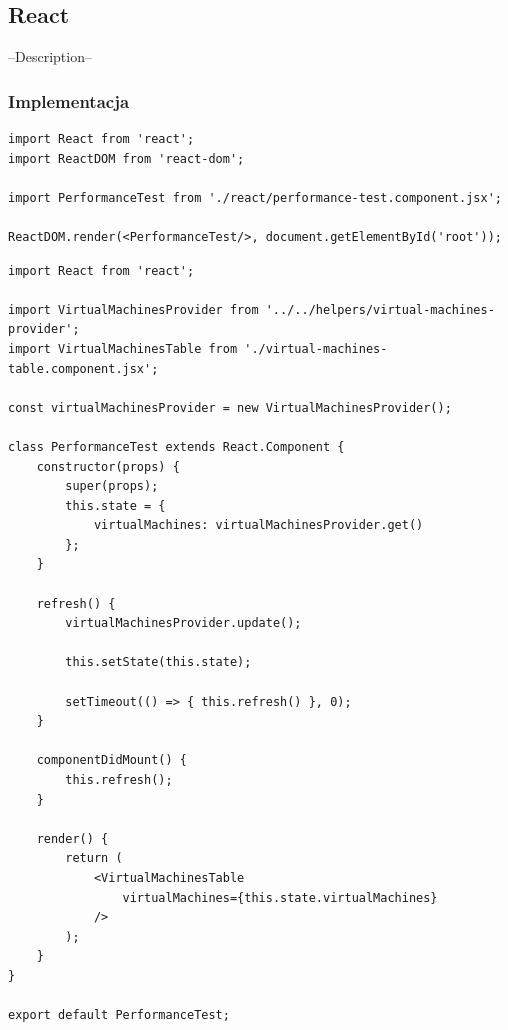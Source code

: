 \documentclass[polish, twoside, 12pt]{mwart}
\begin{document}
\subsection{React}

--Description--

\subsubsection{Implementacja}

\begin{lstlisting}[caption=Inicjalizacja głównego komponentu]
import React from 'react';
import ReactDOM from 'react-dom';

import PerformanceTest from './react/performance-test.component.jsx';

ReactDOM.render(<PerformanceTest/>, document.getElementById('root'));
\end{lstlisting}

\begin{lstlisting}[caption=Główny komponent]
import React from 'react';

import VirtualMachinesProvider from '../../helpers/virtual-machines-provider';
import VirtualMachinesTable from './virtual-machines-table.component.jsx';

const virtualMachinesProvider = new VirtualMachinesProvider();

class PerformanceTest extends React.Component {
    constructor(props) {
        super(props);
        this.state = {
            virtualMachines: virtualMachinesProvider.get()
        };
    }

    refresh() {
        virtualMachinesProvider.update();

        this.setState(this.state);

        setTimeout(() => { this.refresh() }, 0);
    }

    componentDidMount() {
        this.refresh();
    }

    render() {
        return (
            <VirtualMachinesTable
                virtualMachines={this.state.virtualMachines}
            />
        );
    }
}

export default PerformanceTest;
\end{lstlisting}
\end{document}
